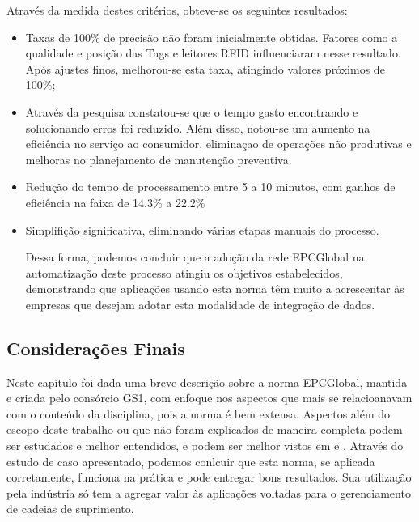 	Através da medida destes critérios, obteve-se os seguintes resultados:
	\begin{itemize}
		\item Taxas de 100\% de precisão não foram inicialmente obtidas. Fatores como a qualidade e posição das Tags e leitores RFID influenciaram nesse resultado. Após ajustes finos, melhorou-se esta taxa, atingindo valores próximos de 100\%;
		\item Através da pesquisa constatou-se que o tempo gasto encontrando e solucionando erros foi reduzido. Além disso, notou-se um aumento na eficiência no serviço ao consumidor, eliminaçao de operações não produtivas e melhoras no planejamento de manutenção preventiva.
		\item Redução do tempo de processamento entre 5 a 10 minutos, com ganhos de eficiência na faixa de 14.3\% a 22.2\% 
		\item Simplifição significativa, eliminando várias etapas manuais do processo.
		
	Dessa forma, podemos concluir que a adoção da rede EPCGlobal na automatização deste processo atingiu os objetivos estabelecidos, demonstrando que aplicações usando esta norma têm muito a acrescentar às empresas que desejam adotar esta modalidade de integração de dados.
		
	\end{itemize} 
	
	
	\subsection{Considerações Finais}
	Neste capítulo foi dada uma breve descrição sobre a norma EPCGlobal, mantida e criada pelo consórcio GS1, com enfoque nos aspectos que mais se relacioanavam com o conteúdo da disciplina, pois a norma é bem extensa. Aspectos além do escopo deste trabalho ou que não foram explicados de maneira completa podem ser estudados e melhor entendidos, e podem ser melhor vistos em \cite{gs1} e \cite{gs1arc}. Através do estudo de caso apresentado, podemos conlcuir que esta norma, se aplicada corretamente, funciona na prática e pode entregar bons resultados. Sua utilização pela indústria só tem a agregar valor às aplicações voltadas para o gerenciamento de cadeias de suprimento.
	

%
%

		
%